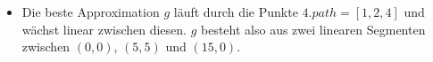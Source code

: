 \documentclass[a4paper]{scrartcl}
\begin{document}
\begin{enumerate}[(a)]
\begin{itemize}
\begin{itemize}
                \end{itemize}

            \item Die beste Approximation $g$ läuft durch die Punkte
                $4.path = [1, 2, 4]$ und wächst linear zwischen diesen.
                $g$ besteht also aus zwei linearen Segmenten zwischen $(0, 0)$,
                $(5, 5)$ und $(15, 0)$.
                
        \end{itemize}

\end{enumerate}
\end{document}
